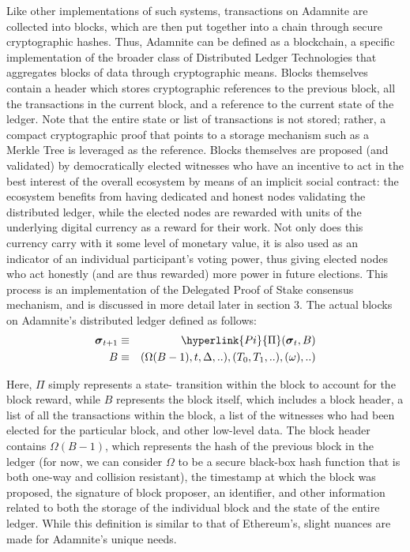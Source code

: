 \documentclass[conference]{IEEEtran}
\begin{document}
Like other implementations of such systems, transactions on Adamnite are collected into blocks, which are then put together into a chain through secure cryptographic hashes. Thus, Adamnite can be defined as a blockchain, a specific implementation of the broader class of Distributed Ledger Technologies that aggregates blocks of data through cryptographic means.  Blocks themselves contain a header which stores cryptographic references to the previous block, all the transactions in the current block, and a reference to the current state of the ledger. Note that the entire state or list of transactions is not stored; rather, a compact cryptographic proof that points to a storage mechanism such as a Merkle Tree is leveraged as the reference. Blocks themselves are proposed (and validated)  by democratically elected witnesses who have an incentive to act in the best interest of the overall ecosystem by means of an implicit social contract: the ecosystem benefits from having dedicated and honest nodes validating the distributed ledger, while the elected nodes are rewarded with units of the underlying digital currency as a reward for their work. Not only does this currency carry with it some level of monetary value, it is also used as an indicator of an individual participant's voting power, thus giving elected nodes who act honestly (and are thus rewarded) more power in future elections. This process is an implementation of the Delegated Proof of Stake consensus mechanism, and is discussed in more detail later in section 3. The actual blocks on Adamnite's distributed ledger defined as follows:
\begin{eqnarray}
\boldsymbol{\sigma}_{t+1} & \equiv & \hyperlink{Pi}{\Pi}(\boldsymbol{\sigma}_{t}, B) \\
B & \equiv & (\Omega(B-1), t, \Delta,..), (T_0, T_1,..),
(\omega),..)
\end{eqnarray}

Here, $\Pi$ simply represents a state-
transition within the block to account for the block reward, while $B$ represents the block itself, which includes a block header, a list of all the transactions within the block, a list of the witnesses who had been elected for the particular block, and other low-level data. The block header contains $\Omega(B-1)$, which represents the hash of the previous block in the ledger (for now, we can consider $\Omega$ to be a secure black-box hash function that is both one-way and collision resistant), the timestamp at which the block was proposed, the signature of block proposer, an identifier, and other information related to both the storage of the individual block and the state of the entire ledger. While this definition is similar to that of Ethereum's, slight nuances are made for Adamnite's unique needs.
\end{document}
